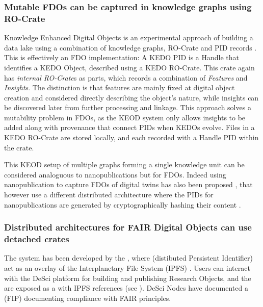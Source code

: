 \subsubsection{Mutable FDOs can be captured in knowledge graphs using RO-Crate}
\label{ch61:datalakes}

Knowledge Enhanced Digital Objects  \cite{Luo 2022} is an experimental approach of building a data lake using a combination of knowledge graphs, RO-Crate and PID records \cite{Luo 2023}. This is effectively an FDO implementation: A KEDO PID is a Handle that identifies a KEDO Object, described using a KEDO RO-Crate. This crate again has \emph{internal RO-Crate}s as parts, which records a combination of \emph{Features} and \emph{Insights}. The distinction is that features are mainly fixed at digital object creation and considered directly describing the object's nature, while insights can be discovered later from further processing and linkage. This approach solves a mutability problem in FDOs, as the KEOD system only allows insights to be added along with provenance that connect PIDs when KEDOs evolve. Files in a KEDO RO-Crate are stored locally, and each recorded with a Handle PID within the crate.

This KEOD setup of multiple graphs forming a single knowledge unit can be considered analoguous to nanopublications \cite{Kuhn 2021} but for FDOs. Indeed using nanopublication to capture FDOs of digital twins has also been proposed \cite{10.3389/data.2022.883341}, that however use a different distributed architecture where the PIDs for nanopublications are generated by cryptographically hashing their content \cite{Kuhn 2021}.


\subsubsection{Distributed architectures for FAIR Digital Objects can use detached crates}
\label{ch61:dpid}

The  system has been developed by the , where  (distibuted Persistent Identifier) act  as an overlay of the Interplanetary File System (IPFS) \cite{Trautwein 2022}. 
Users can interact with the DeSci platform for building and publishing Research Objects, and the  are exposed as a  with IPFS references (see ). 
DeSci Nodes have documented a  (FIP) \cite{FIP} documenting compliance with FAIR principles. 

